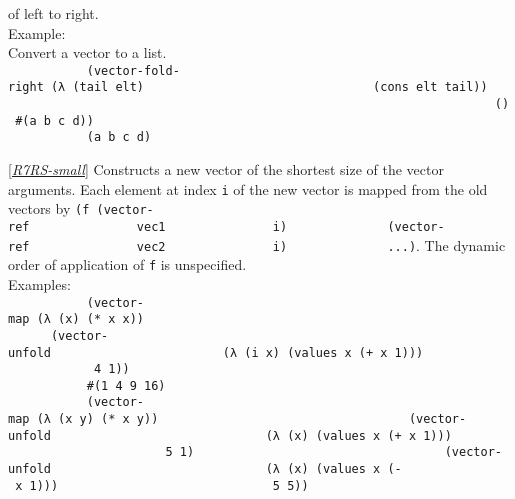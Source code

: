 \begin{description}
of left to right.\\[2\baselineskip]Example:\\[2\baselineskip]Convert a
vector to a list.\\
\texttt{\ \ \ \ \ \ \ \ \ \ \ (vector-fold-right\ (λ\ (tail\ elt)\ \ \ \ \ \ \ \ \ \ \ \ \ \ \ \ \ \ \ \ \ \ \ \ \ \ \ \ \ \ \ \ (cons\ elt\ tail))\ \ \ \ \ \ \ \ \ \ \ ~~~~~~~~~\ \ \ \ \ \ \ \ \ \ \ ~~~~~~~~~~\ \ \ \ \ \ \ \ \ \ \ \ \ \ \ \ \ \ \ \ \ \ \ \ \ \ \ \ \ \ \textquotesingle{}()\ \textquotesingle{}\#(a\ b\ c\ d))\ \ \ \ \ \ \ \ \ }\\
\texttt{\ \ \ \ \ \ \ \ \ \ \ (a\ b\ c\ d)\ \ \ \ \ \ \ \ \ }\\[2\baselineskip]
\end{description}

\begin{description}
\tightlist
\item[ \href{}{(vector-map \emph{f vec\textsubscript{1}
vec\textsubscript{2} \ldots{}}) -\textgreater{} vector} ]
{[}\protect\hyperlink{R7RS-small}{\emph{R7RS-small}}{]} Constructs a new
vector of the shortest size of the vector arguments. Each element at
index \texttt{i} of the new vector is mapped from the old vectors by
\texttt{(f\ (vector-ref\ \ \ \ \ \ \ \ \ \ \ \ \ \ \ vec1\ \ \ \ \ \ \ \ \ \ \ \ \ \ \ i)\ \ \ \ \ \ \ \ \ \ \ \ \ \ (vector-ref\ \ \ \ \ \ \ \ \ \ \ \ \ \ \ vec2\ \ \ \ \ \ \ \ \ \ \ \ \ \ \ i)\ \ \ \ \ \ \ \ \ \ \ \ \ \ ...)}.
The dynamic order of application of \texttt{f} is
unspecified.\\[2\baselineskip]Examples:\\[2\baselineskip]\texttt{\ \ \ \ \ \ \ \ \ \ \ (vector-map\ (λ\ (x)\ (*\ x\ x))\ \ \ \ \ \ \ \ \ \ \ ~~~~~~~~~\ \ \ \ \ \ \ \ \ \ \ ~~~\ \ \ \ \ \ \ \ \ \ \ \ \ \ \ \ \ \ \ \ \ \ \ (vector-unfold\ \ \ \ \ \ \ \ \ \ \ \ \ \ \ \ \ \ \ \ \ \ \ \ (λ\ (i\ x)\ (values\ x\ (+\ x\ 1)))\ \ \ \ \ \ \ \ \ \ \ \ \ \ \ \ \ \ \ \ \ \ \ \ 4\ 1))\ \ \ \ \ \ \ \ \ }\\
\texttt{\ \ \ \ \ \ \ \ \ \ \ \#(1\ 4\ 9\ 16)\ \ \ \ \ \ \ \ \ }\\[2\baselineskip]\texttt{\ \ \ \ \ \ \ \ \ \ \ (vector-map\ (λ\ (x\ y)\ (*\ x\ y))\ \ \ \ \ \ \ \ \ \ \ ~~~~~~~~~~\ \ \ \ \ \ \ \ \ \ \ ~~~(vector-unfold\ \ \ \ \ \ \ \ \ \ \ \ \ \ \ \ \ \ \ \ \ \ \ \ \ \ \ \ \ \ (λ\ (x)\ (values\ x\ (+\ x\ 1)))\ \ \ \ \ \ \ \ \ \ \ \ \ \ \ \ \ \ \ \ \ \ \ \ \ \ \ \ \ \ 5\ 1)\ \ \ \ \ \ \ \ \ \ \ ~~~~~~~~~~\ \ \ \ \ \ \ \ \ \ \ ~~~(vector-unfold\ \ \ \ \ \ \ \ \ \ \ \ \ \ \ \ \ \ \ \ \ \ \ \ \ \ \ \ \ \ (λ\ (x)\ (values\ x\ (-\ x\ 1)))\ \ \ \ \ \ \ \ \ \ \ \ \ \ \ \ \ \ \ \ \ \ \ \ \ \ \ \ \ \ 5\ 5))\ \ \ \ \ \ \ \ \ }\\

\end{description}
